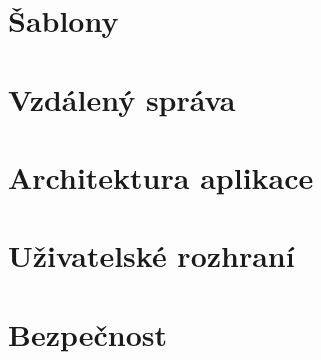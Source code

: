 \section{Šablony}
\label{chapter:design:templates}
\section{Vzdálený správa}
\label{chapter:design:remote}
\section{Architektura aplikace}
\label{chapter:design:architecture}
\section{Uživatelské rozhraní}
\label{chapter:design:ui}
\section{Bezpečnost}
\label{chapter:design:security}
